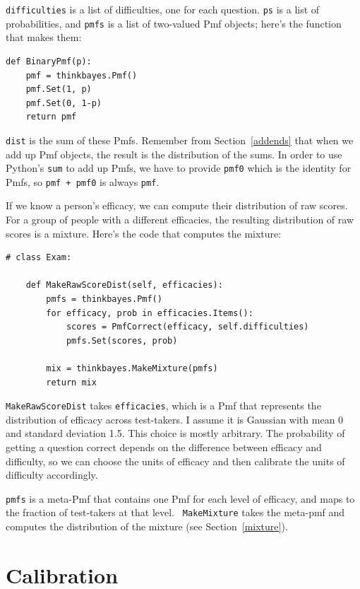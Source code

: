 \documentclass[12pt]{book}
\begin{document}
{\tt difficulties} is a list of difficulties, one for each question.
{\tt ps} is a list of probabilities, and {\tt pmfs} is a list of
two-valued Pmf objects; here's the function that makes them:

\begin{verbatim}
def BinaryPmf(p):
    pmf = thinkbayes.Pmf()
    pmf.Set(1, p)
    pmf.Set(0, 1-p)
    return pmf
\end{verbatim}

{\tt dist} is the sum of these Pmfs.  Remember from Section~\ref{addends}
that when we add up Pmf objects, the result is the distribution
of the sums.  In order to use Python's {\tt sum} to add up Pmfs,
we have to provide {\tt pmf0} which is the identity for Pmfs,
so {\tt pmf + pmf0} is always {\tt pmf}.

If we know a person's efficacy, we can compute their distribution
of raw scores.  For a group of people with a different efficacies, the
resulting distribution of raw scores is a mixture.  Here's the code
that computes the mixture:

\begin{verbatim}
# class Exam:

    def MakeRawScoreDist(self, efficacies):
        pmfs = thinkbayes.Pmf()
        for efficacy, prob in efficacies.Items():
            scores = PmfCorrect(efficacy, self.difficulties)
            pmfs.Set(scores, prob)

        mix = thinkbayes.MakeMixture(pmfs)
        return mix
\end{verbatim}

{\tt MakeRawScoreDist} takes {\tt efficacies}, which is a Pmf that
represents the distribution of efficacy across test-takers.  I assume
it is Gaussian with mean 0 and standard deviation 1.5.  This
choice is mostly arbitrary.  The probability of getting a question
correct depends on the difference between efficacy and difficulty, so
we can choose the units of efficacy and then calibrate the units of
difficulty accordingly.  

{\tt pmfs} is a meta-Pmf that contains one Pmf for each level of
efficacy, and maps to the fraction of test-takers at that level.  {\tt
  MakeMixture} takes the meta-pmf and computes the distribution of the
mixture (see Section~\ref{mixture}).  


\section{Calibration}
\end{document}
